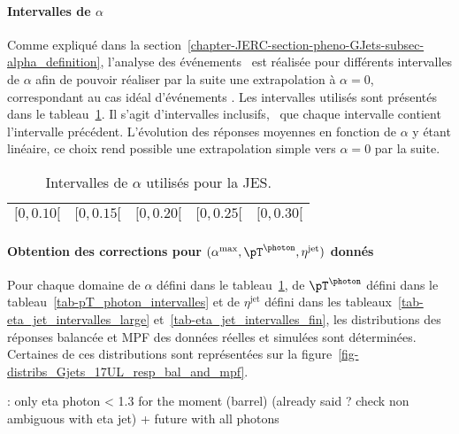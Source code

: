 \paragraph{Intervalles de $\alpha$}
Comme expliqué dans la section~\ref{chapter-JERC-section-pheno-GJets-subsec-alpha_definition}, l'analyse des événements \Gjets\ est réalisée pour différents intervalles de $\alpha$ afin de pouvoir réaliser par la suite une extrapolation à $\alpha=0$, correspondant au cas idéal d'événements \Gjet.
Les intervalles utilisés sont présentés dans le tableau~\ref{tab-alpha_intervalles}.
Il s'agit d'intervalles inclusifs, \ie\ que chaque intervalle contient l'intervalle précédent.
L'évolution des réponses moyennes en fonction de $\alpha$ y étant linéaire, ce choix rend possible une extrapolation simple vers $\alpha=0$ par la suite.
\begin{table}[h]
\centering
\begin{tabular}{ccccc}
\toprule
$[\num{0}, \num{0.10}[$ & $[\num{0}, \num{0.15}[$ & $[\num{0}, \num{0.20}[$ & $[\num{0}, \num{0.25}[$ & $[\num{0}, \num{0.30}[$ \\
\bottomrule
\end{tabular}
\caption{Intervalles de $\alpha$ utilisés pour la JES.}
\label{tab-alpha_intervalles}
\end{table}
\paragraph{Obtention des corrections pour $(\alpha^\text{max}, \pT^{\photon}, \eta^\text{jet})$ donnés}
Pour chaque domaine
de $\alpha$ défini dans le tableau~\ref{tab-alpha_intervalles},
de $\pT^{\photon}$ défini dans le tableau~\ref{tab-pT_photon_intervalles} et
de $\eta^\text{jet}$ défini dans les tableaux~\ref{tab-eta_jet_intervalles_large} et~\ref{tab-eta_jet_intervalles_fin},
les distributions des réponses balancée et MPF des données réelles et simulées sont déterminées.
Certaines de ces distributions sont représentées sur la figure~\ref{fig-distribs_Gjets_17UL_resp_bal_and_mpf}.


\par {}: only eta photon < 1.3 for the moment (barrel) (already said ? check non ambiguous with eta jet) + future with all photons


